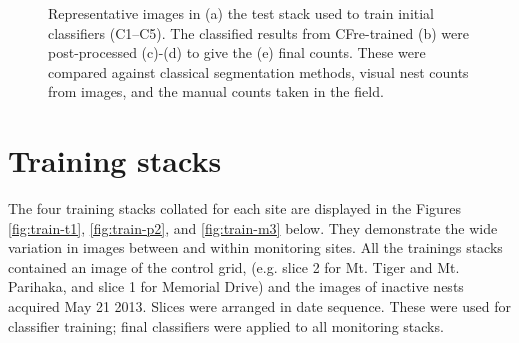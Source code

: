 \begin{figure}[!htbp]\myfloatalign
{} \\
 \\
 \\
 \\
 \\
\caption[Test image stack.]{Representative images in (a) the test stack used to train initial classifiers (C1--C5). The classified results from CF{\scriptsize re-trained} (b) were post-processed (c)-(d) to give the (e) final counts. These were compared against classical segmentation methods, visual nest counts from images, and the manual counts taken in the field.}\label{fig:test-stack-processed}
\end{figure}

\section{Training stacks}\label{sec:training-stacks}
The four training stacks collated for each site are displayed in the Figures \ref{fig:train-t1}, \ref{fig:train-p2}, and \ref{fig:train-m3} below. They demonstrate the wide variation in images between and within monitoring sites. All the trainings stacks contained an image of the control grid, (e.g. slice 2 for Mt. Tiger and Mt. Parihaka, and slice 1 for Memorial Drive) and the images of inactive nests acquired May 21 2013. Slices were arranged in date sequence. These were used for classifier training; final classifiers were applied to all monitoring stacks.

